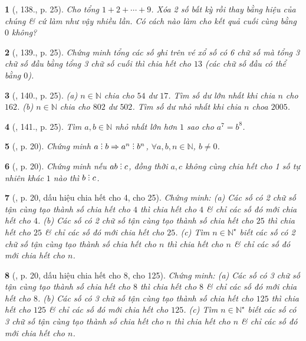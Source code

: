 \documentclass{article}
\newtheorem{baitoan}{}
\DeclareRobustCommand{\divby}{%
	\mathrel{\vbox{\baselineskip.65ex\lineskiplimit0pt\hbox{.}\hbox{.}\hbox{.}}}%
}
\begin{document}
\begin{baitoan}[\cite{Binh_Toan_6_tap_1}, 138., p. 25]
	Cho tổng $1 + 2 + \cdots + 9$. Xóa 2 số bất kỳ rồi thay bằng hiệu của chúng \& cứ làm như vậy nhiều lần. Có cách nào làm cho kết quả cuối cùng bằng $0$ không?
\end{baitoan}

\begin{baitoan}[\cite{Binh_Toan_6_tap_1}, 139., p. 25]
	Chứng minh tổng các số ghi trên vé xổ số có 6 chữ số mà tổng 3 chữ số đầu bằng tổng 3 chữ số cuối thì chia hết cho $13$ (các chữ số đầu có thể bằng $0$).
\end{baitoan}

\begin{baitoan}[\cite{Binh_Toan_6_tap_1}, 140., p. 25]
	(a) $n\in\mathbb{N}$ chia cho $54$ dư $17$. Tìm số dư lớn nhất khi chia $n$ cho $162$. (b) $n\in\mathbb{N}$ chia cho $802$ dư $502$. Tìm số dư nhỏ nhất khi chia $n$ choa $2005$.
\end{baitoan}

\begin{baitoan}[\cite{Binh_Toan_6_tap_1}, 141., p. 25]
	Tìm $a,b\in\mathbb{N}$ nhỏ nhất lớn hơn $1$ sao cho $a^7 = b^8$.
\end{baitoan}

\begin{baitoan}[\cite{TLCT_THCS_Toan_6_so_hoc}, p. 20]
	Chứng minh $a\divby b\Rightarrow a^n\divby b^n$, $\forall a,b,n\in\mathbb{N}$, $b\ne0$.
\end{baitoan}

\begin{baitoan}[\cite{TLCT_THCS_Toan_6_so_hoc}, p. 20]
	Chứng minh nếu $ab\divby c$, đồng thời $a,c$ không cùng chia hết cho 1 số tự nhiên khác $1$ nào thì $b\divby c$.
\end{baitoan}

\begin{baitoan}[\cite{TLCT_THCS_Toan_6_so_hoc}, p. 20, dấu hiệu chia hết cho 4, cho 25]
	Chứng minh: (a) Các số có 2 chữ số tận cùng tạo thành số chia hết cho $4$ thì chia hết cho $4$ \& chỉ các số đó mới chia hết cho $4$. (b) Các số có 2 chữ số tận cùng tạo thành số chia hết cho $25$ thì chia hết cho $25$ \& chỉ các số đó mới chia hết cho $25$. (c) Tìm $n\in\mathbb{N}^\star$ biết các số có 2 chữ số tận cùng tạo thành số chia hết cho $n$ thì chia hết cho $n$ \& chỉ các số đó mới chia hết cho $n$.
\end{baitoan}

\begin{baitoan}[\cite{TLCT_THCS_Toan_6_so_hoc}, p. 20, dấu hiệu chia hết cho 8, cho 125]
	Chứng minh: (a) Các số có 3 chữ số tận cùng tạo thành số chia hết cho $8$ thì chia hết cho $8$ \& chỉ các số đó mới chia hết cho $8$. (b) Các số có 3 chữ số tận cùng tạo thành số chia hết cho $125$ thì chia hết cho $125$ \& chỉ các số đó mới chia hết cho $125$. (c) Tìm $n\in\mathbb{N}^\star$ biết các số có 3 chữ số tận cùng tạo thành số chia hết cho $n$ thì chia hết cho $n$ \& chỉ các số đó mới chia hết cho $n$.
\end{baitoan}
\end{document}
